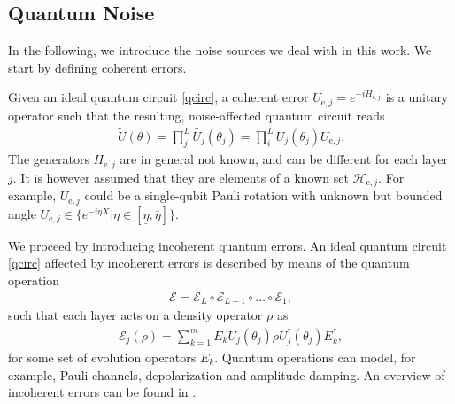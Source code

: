 \documentclass[letterpaper, 10 pt]{IEEEtran}  %
\newcommand{\e}{\mathrm{e}}
\begin{document}
\subsection{Quantum Noise}
In the following, we introduce the noise sources we deal with in this work. 
We start by defining coherent errors. 

Given an ideal quantum circuit \eqref{qcirc},  a coherent error $U_{\e,j}=e^{-i H_{\e,j}}$ is a unitary operator such that 
the resulting, noise-affected quantum circuit reads
\begin{align}
   \tilde{U}(\theta)=\prod_j^L \tilde{U_j}(\theta_j)= \prod_i^L U_j(\theta_j) U_{\e,j}.
\end{align}
The generators $H_{\e,j}$ are in general not known, and can be different for each layer $j$. It is however assumed that they are elements of a known set $\mathcal{H}_{\e, j}$.
For example, $U_{\e,j}$ could be a single-qubit Pauli rotation with unknown but bounded angle $U_{\e,j} \in \{e^{-i\eta X} | \eta \in [\underline\eta, \bar \eta]\}$.

We proceed by introducing incoherent quantum errors. 
An ideal quantum circuit \eqref{qcirc} affected by incoherent errors is described by means of the quantum operation
\begin{align}
   \mathcal{E}=\mathcal{E}_{L} \circ \mathcal{E}_{L-1} \circ \dots \circ \mathcal{E}_{1}, 
\end{align}
such that each layer acts on a density operator $\rho$ as  
\begin{align}
   \mathcal{E}_{j}(\rho)=\sum_{k=1}^{m} E_k U_j(\theta_j) \rho U^\dagger_j(\theta_j) E^\dagger_k,
\end{align}
for some set of evolution operators $E_k$. Quantum operations can model, for example, Pauli channels, depolarization and amplitude damping. An overview of incoherent errors can be found in \cite[Chapter 8]{Nielsen2012}.     
\\




\end{document}
